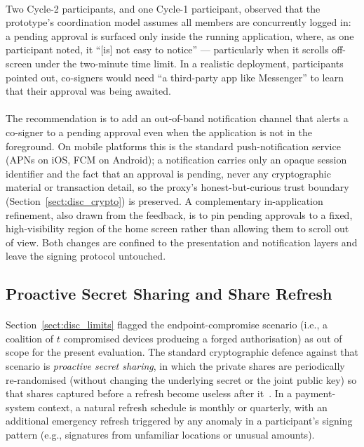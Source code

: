 \paragraph{}Two Cycle-2 participants, and one Cycle-1 participant, observed that the prototype's coordination model assumes all members are concurrently logged in: a pending approval is surfaced only inside the running application, where, as one participant noted, it ``[is] not easy to notice'' --- particularly when it scrolls off-screen under the two-minute time limit. In a realistic deployment, participants pointed out, co-signers would need ``a third-party app like Messenger'' to learn that their approval was being awaited.

\paragraph{}The recommendation is to add an out-of-band notification channel that alerts a co-signer to a pending approval even when the application is not in the foreground. On mobile platforms this is the standard push-notification service (APNs on iOS, FCM on Android); a notification carries only an opaque session identifier and the fact that an approval is pending, never any cryptographic material or transaction detail, so the proxy's honest-but-curious trust boundary (Section~\ref{sect:disc_crypto}) is preserved. A complementary in-application refinement, also drawn from the feedback, is to pin pending approvals to a fixed, high-visibility region of the home screen rather than allowing them to scroll out of view. Both changes are confined to the presentation and notification layers and leave the signing protocol untouched.

\subsection{Proactive Secret Sharing and Share Refresh}
\label{sect:rec_proactive}

\paragraph{}Section~\ref{sect:disc_limits} flagged the endpoint-compromise scenario (i.e., a coalition of $t$ compromised devices producing a forged authorisation) as out of scope for the present evaluation. The standard cryptographic defence against that scenario is \textit{proactive secret sharing}, in which the private shares are periodically re-randomised (without changing the underlying secret or the joint public key) so that shares captured before a refresh become useless after it~\cite{shamir1979, gennaro2007}. In a payment-system context, a natural refresh schedule is monthly or quarterly, with an additional emergency refresh triggered by any anomaly in a participant's signing pattern (e.g., signatures from unfamiliar locations or unusual amounts).

